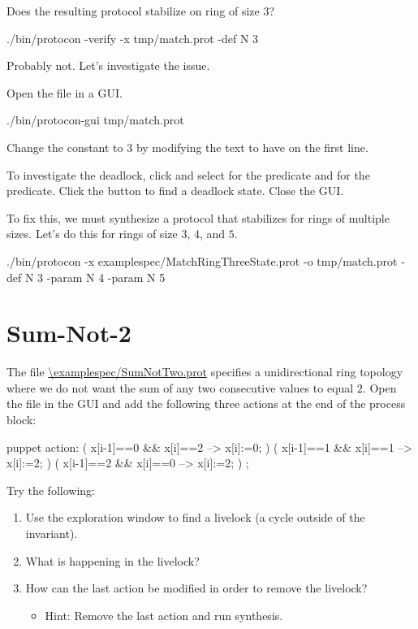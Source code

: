 Does the resulting protocol stabilize on ring of size $3$?
\begin{code}
./bin/protocon -verify -x tmp/match.prot -def N 3
\end{code}
Probably not. Let's investigate the issue.

Open the file in a GUI.
\begin{code}
./bin/protocon-gui tmp/match.prot
\end{code}
Change the constant  to $3$ by modifying the text to have  on the first line.

To investigate the deadlock, click  and select  for the  predicate and  for the  predicate.
Click the  button to find a deadlock state.
Close the GUI.

To fix this, we must synthesize a protocol that stabilizes for rings of multiple sizes.
Let's do this for rings of size $3$, $4$, and $5$.
\begin{code}
./bin/protocon -x examplespec/MatchRingThreeState.prot -o tmp/match.prot -def N 3 -param N 4 -param N 5
\end{code}


\section{Sum-Not-2}

The file \url{\examplespec/SumNotTwo.prot} specifies a unidirectional ring topology where we do not want the sum of any two consecutive values to equal $2$.
Open the file in the GUI and add the following three actions at the end of the process block:
\begin{code}
  puppet action:
    ( x[i-1]==0 && x[i]==2 --> x[i]:=0; )
    ( x[i-1]==1 && x[i]==1 --> x[i]:=2; )
    ( x[i-1]==2 && x[i]==0 --> x[i]:=2; )
    ;
\end{code}

Try the following:
\begin{enumerate}
\item Use the exploration window to find a livelock (a cycle outside of the invariant).
\item What is happening in the livelock?
\item How can the last action be modified in order to remove the livelock?
 \begin{itemize}
 \item Hint: Remove the last action and run synthesis.
 \end{itemize}
\end{enumerate}



